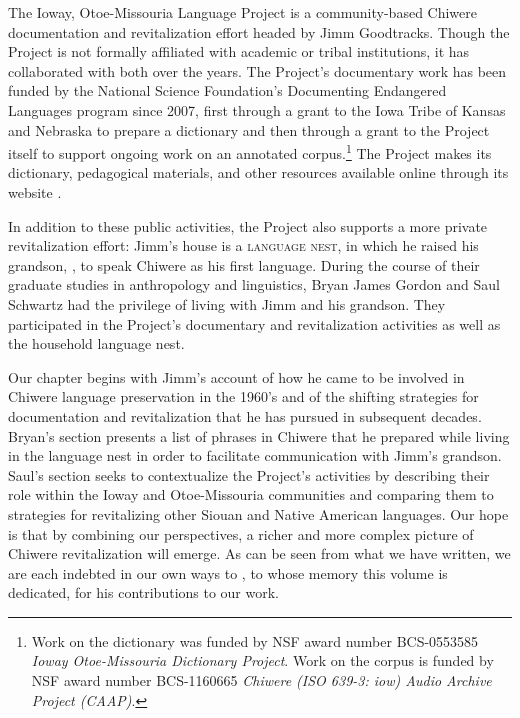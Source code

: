 \documentclass[output=paper]{LSP/langsci}
\begin{document}
The Ioway, Otoe-Missouria Language Project is a community-based Chiwere documentation and revitalization effort headed by Jimm Goodtracks. Though the Project is not formally affiliated with academic or tribal institutions, it has collaborated with both over the years. The Project's documentary work has been funded by the National Science Foundation's Documenting Endangered Languages program since 2007, first through a grant to the Iowa Tribe of Kansas and Nebraska to prepare a dictionary and then through a grant to the Project itself to support ongoing work on an annotated corpus.\footnote{Work on the dictionary was funded by NSF award number BCS-0553585 \emph{Ioway Otoe-Missouria Dictionary Project}. Work on the corpus is funded by NSF award number BCS-1160665 \emph{Chiwere (ISO 639-3: iow) Audio Archive Project (CAAP)}.}  The Project makes its dictionary, pedagogical materials, and other resources available online through its website \citep{GoodtracksND}.

In addition to these public activities, the Project also supports a more private revitalization effort: Jimm's house is a \textsc{language nest}, in which he raised his grandson, , to speak Chiwere as his first language. During the course of their graduate studies in anthropology and linguistics, Bryan James Gordon and Saul Schwartz had the privilege of living with Jimm and his grandson. They participated in the Project's documentary and revitalization activities as well as the household language nest.

Our chapter begins with Jimm's account of how he came to be involved in Chiwere language preservation in the 1960's and of the shifting strategies for documentation and revitalization that he has pursued in subsequent decades. Bryan's section presents a list of phrases in Chiwere that he prepared while living in the language nest in order to facilitate communication with Jimm's grandson. Saul's section seeks to contextualize the Project's activities by describing their role within the Ioway and Otoe-Missouria communities and comparing them to strategies for revitalizing other Siouan and Native American languages. Our hope is that by combining our perspectives, a richer and more complex picture of Chiwere revitalization will emerge. As can be seen from what we have written, we are each indebted in our own ways to , to whose memory this volume is dedicated, for his contributions to our work.
\end{document}
